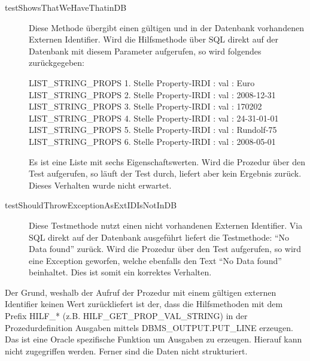 \begin{description}
\item[ testShowsThatWeHaveThatinDB] Diese Methode übergibt einen gültigen und in der Datenbank vorhandenen Externen Identifier. Wird die Hilfsmethode über SQL direkt auf der Datenbank mit diesem Parameter aufgerufen, so wird folgendes zurückgegeben:

  LIST\_STRING\_PROPS 1. Stelle
  Property-IRDI :  val : Euro
  LIST\_STRING\_PROPS 2. Stelle
  Property-IRDI :  val : 2008-12-31
  LIST\_STRING\_PROPS 3. Stelle
  Property-IRDI :  val : 170202
  LIST\_STRING\_PROPS 4. Stelle
  Property-IRDI :  val : 24-31-01-01
  LIST\_STRING\_PROPS 5. Stelle
  Property-IRDI :  val : Rundolf-75
  LIST\_STRING\_PROPS 6. Stelle
  Property-IRDI :  val : 2008-05-01
  
Es ist eine Liste mit sechs Eigenschaftswerten.
Wird die Prozedur über den Test aufgerufen, so läuft der Test durch, liefert aber kein Ergebnis zurück. Dieses Verhalten wurde nicht erwartet. 
  
\item[ testShouldThrowExceptionAsExtIDIsNotInDB] Diese Testmethode nutzt einen nicht vorhandenen Externen Identifier. Via SQL direkt auf der Datenbank ausgeführt liefert die Testmethode: \enquote{No Data found} zurück. 
Wird die Prozedur über den Test aufgerufen, so wird eine Exception geworfen, welche ebenfalls den Text  \enquote{No Data found} beinhaltet. Dies ist somit ein korrektes Verhalten. 
\end{description}

Der Grund, weshalb der Aufruf der Prozedur mit einem gültigen externen Identifier keinen Wert zurückliefert ist der, dass die Hilfsmethoden mit dem Prefix HILF\_* (z.B. HILF\_GET\_PROP\_VAL\_STRING) in der Prozedurdefinition Ausgaben mittels DBMS\_OUTPUT.PUT\_LINE erzeugen. Das ist eine Oracle spezifische Funktion um Ausgaben zu erzeugen. Hierauf kann nicht zugegriffen werden. Ferner sind die Daten nicht strukturiert.   

